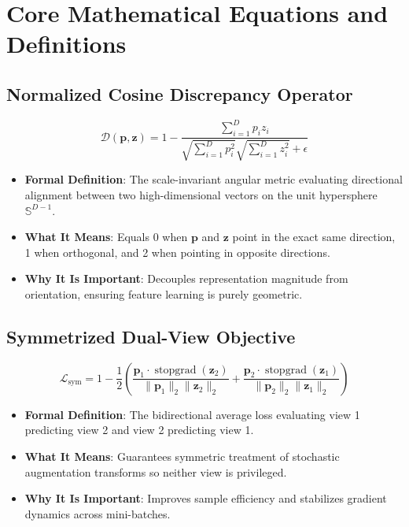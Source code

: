\documentclass[11pt,a4paper]{article}
\theoremstyle{definition}
\begin{document}
\section{Core Mathematical Equations and Definitions}

\subsection{Normalized Cosine Discrepancy Operator}
{\boldmath
\begin{equation}
\mathcal{D}(\mathbf{p}, \mathbf{z}) = 1 - \frac{\sum_{i=1}^D p_i z_i}{\sqrt{\sum_{i=1}^D p_i^2} \sqrt{\sum_{i=1}^D z_i^2} + \epsilon}
\end{equation}
}
\begin{itemize}
    \item \textbf{Formal Definition}: The scale-invariant angular metric evaluating directional alignment between two high-dimensional vectors on the unit hypersphere $\mathbb{S}^{D-1}$.
    \item \textbf{What It Means}: Equals 0 when $\mathbf{p}$ and $\mathbf{z}$ point in the exact same direction, 1 when orthogonal, and 2 when pointing in opposite directions.
    \item \textbf{Why It Is Important}: Decouples representation magnitude from orientation, ensuring feature learning is purely geometric.
\end{itemize}

\subsection{Symmetrized Dual-View Objective}
{\boldmath
\begin{equation}
\mathcal{L}_{\text{sym}} = 1 - \frac{1}{2} \left( \frac{\mathbf{p}_1 \cdot \operatorname{stopgrad}(\mathbf{z}_2)}{\|\mathbf{p}_1\|_2 \|\mathbf{z}_2\|_2} + \frac{\mathbf{p}_2 \cdot \operatorname{stopgrad}(\mathbf{z}_1)}{\|\mathbf{p}_2\|_2 \|\mathbf{z}_1\|_2} \right)
\end{equation}
}
\begin{itemize}
    \item \textbf{Formal Definition}: The bidirectional average loss evaluating view 1 predicting view 2 and view 2 predicting view 1.
    \item \textbf{What It Means}: Guarantees symmetric treatment of stochastic augmentation transforms so neither view is privileged.
    \item \textbf{Why It Is Important}: Improves sample efficiency and stabilizes gradient dynamics across mini-batches.
\end{itemize}
\end{document}
